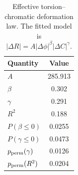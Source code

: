 \begin{table}[t]
\centering
\caption{
Effective torsion--chromatic deformation law.
The fitted model is
$|\Delta R| = A |\Delta\phi|^\beta |\Delta C|^\gamma$.
}
\label{tab:torsion_chromatic_law}
\begin{tabular}{l c}
\hline
Quantity & Value \\
\hline
$A$ & 285.913 \\
$\beta$ & 0.302 \\
$\gamma$ & 0.291 \\
$R^2$ & 0.188 \\
$P(\beta \le 0)$ & 0.0255 \\
$P(\gamma \le 0)$ & 0.0473 \\
$p_{\rm perm}(\gamma)$ & 0.0126 \\
$p_{\rm perm}(R^2)$ & 0.0204 \\
\hline
\end{tabular}
\end{table}
